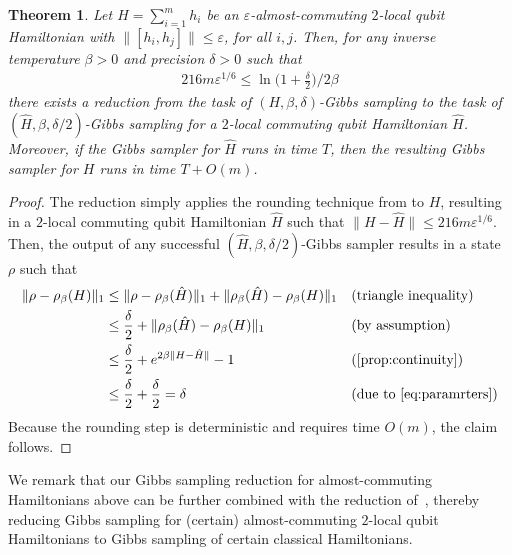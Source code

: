\documentclass[11pt]{article}
\theoremstyle{plain}
\newtheorem{theorem}{Theorem}[section]
\newcommand{\eps}{\varepsilon}
\begin{document}
\begin{theorem} 
Let $H = \sum_{i=1}^m h_i$ be an $\eps$-almost-commuting $2$-local qubit Hamiltonian with $\| [h_i,h_j]\| \leq \eps$, for all $i,j$. Then, for any inverse temperature $\beta >0$ and precision $\delta >0$ such that
\begin{align}\label{eq:paramrters}
216 m \eps^{1/6} \leq  \ln\Big(1+\frac{\delta}{2} \Big)/2\beta
\end{align}
there exists a reduction from the task of $(H,\beta,\delta)$-Gibbs sampling to the task of $(\hat{H},\beta,\delta/2)$-Gibbs sampling for a $2$-local commuting qubit Hamiltonian $\hat{H}$. Moreover, if the Gibbs sampler for $\hat{H}$ runs in time $T$, then the resulting Gibbs sampler for $H$ runs in time $T + O(m)$.
\end{theorem}
\begin{proof}
The reduction simply applies the rounding technique from  to $H$, resulting in a $2$-local commuting qubit Hamiltonian $\hat{H}$ such that $\| H - \hat{H} \| \leq 216 m \eps^{1/6}$. Then, the output of any successful $(\hat{H},\beta,\delta/2)$-Gibbs sampler results in a state $\rho$ such that
\begin{align*}
\| \rho - \rho_\beta(H) \|_1 
&\leq \| \rho - \rho_\beta(\hat{H}) \|_1  + \| \rho_\beta(\hat{H}) - \rho_\beta(H) \|_1    && (\text{triangle inequality})\\
&\leq \frac{\delta}{2} + \| \rho_\beta(\hat{H}) - \rho_\beta(H) \|_1 && (\text{by assumption})\\
&\leq  \frac{\delta}{2}  + e^{2 \beta \| H - \hat{H} \|} -1  && (\text{\Cref{prop:continuity}})\\
&\leq \frac{\delta}{2} + \frac{\delta}{2}  = \delta  && (\text{due to~\eqref{eq:paramrters}})
\end{align*}
Because the rounding step is deterministic and requires time $O(m)$, the claim follows.
\end{proof}
We remark that our Gibbs sampling reduction for almost-commuting Hamiltonians above can be further combined with the reduction of~\cite[Theorem 9]{hwang2025gibbsstatepreparationcommuting}, thereby reducing Gibbs sampling for (certain) almost-commuting $2$-local qubit Hamiltonians to Gibbs sampling of certain classical Hamiltonians.
\end{document}
